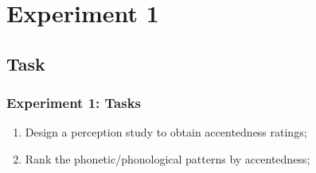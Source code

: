 \documentclass{beamer}
\begin{document}
\section{Experiment 1}
\subsection{Task}
\begin{frame}
\frametitle{Experiment 1: Tasks}
\begin{enumerate}
\item{Design a perception study to obtain accentedness ratings;}\linebreak
\item{Rank the phonetic/phonological patterns by accentedness;}\linebreak
\end{enumerate}
\end{frame}

\end{document}
